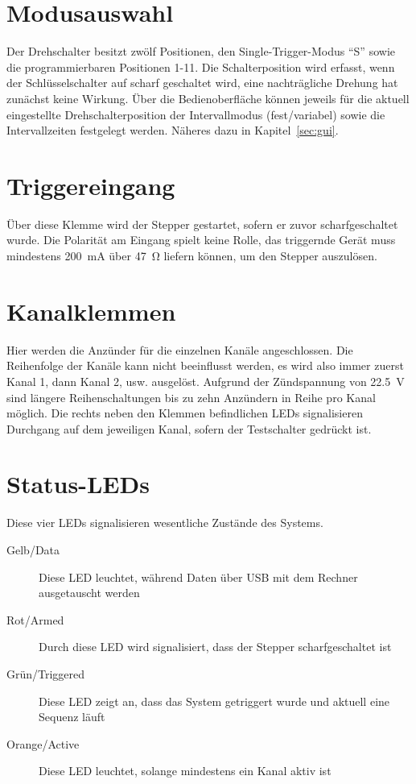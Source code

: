 \documentclass[paper=a4, open=any]{scrbook}
\begin{document}
		\section{Modusauswahl}
			Der Drehschalter besitzt zwölf Positionen, den Single-Trigger-Modus \enquote{S} sowie die programmierbaren Positionen 1-11. Die Schalterposition wird erfasst, wenn der Schlüsselschalter auf scharf geschaltet wird, eine nachträgliche Drehung hat zunächst keine Wirkung. Über die Bedienoberfläche können jeweils für die aktuell eingestellte Drehschalterposition der Intervallmodus (fest/variabel) sowie die Intervallzeiten festgelegt werden. Näheres dazu in Kapitel~\ref{sec:gui}.

		\section{Triggereingang}
			Über diese Klemme wird der Stepper gestartet, sofern er zuvor scharfgeschaltet wurde. Die Polarität am Eingang spielt keine Rolle, das triggernde Gerät muss mindestens \SI{200}{\milli\ampere} über \SI{47}{\ohm} liefern können, um den Stepper auszulösen.

		\section{Kanalklemmen}
			Hier werden die Anzünder für die einzelnen Kanäle angeschlossen. Die Reihenfolge der Kanäle kann nicht beeinflusst werden, es wird also immer zuerst Kanal 1, dann Kanal 2, usw. ausgelöst. Aufgrund der Zündspannung von \SI{22,5}{\volt} sind längere Reihenschaltungen bis zu zehn Anzündern in Reihe pro Kanal möglich. Die rechts neben den Klemmen befindlichen LEDs signalisieren Durchgang auf dem jeweiligen Kanal, sofern der Testschalter gedrückt ist.

		\section{Status-LEDs}
			Diese vier LEDs signalisieren wesentliche Zustände des Systems.
			\begin{description}
				\item[Gelb/Data] Diese LED leuchtet, während Daten über USB mit dem Rechner ausgetauscht werden
				\item[Rot/Armed] Durch diese LED wird signalisiert, dass der Stepper scharfgeschaltet ist
				\item[Grün/Triggered] Diese LED zeigt an, dass das System getriggert wurde und aktuell eine Sequenz läuft
				\item[Orange/Active] Diese LED leuchtet, solange mindestens ein Kanal aktiv ist
			\end{description}
\end{document}
